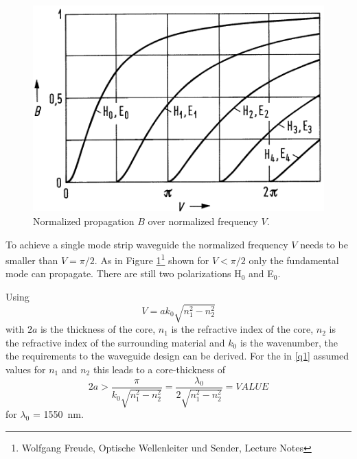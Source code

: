 \begin{figure}%
\centering
\includegraphics[width=.5\columnwidth]{Grafiken/SingleMode.png}%
\caption{Normalized propagation $B$ over normalized frequency $V$.}%
\label{fig:singlemoded}%
\end{figure}
To achieve a single mode strip waveguide the normalized frequency $V$ needs to be smaller than $V=\pi/2$. As in Figure \ref{fig:singlemoded}\footnote[1]{Wolfgang Freude, Optische Wellenleiter und Sender, Lecture Notes} shown for $V < \pi/2$ only the fundamental mode can propagate. There are still two polarizations H$_0$ and E$_0$.

Using \begin{equation}
V=ak_0\sqrt{n_1^2-n_2^2}
\label{eq:norm_freq}
\end{equation}
with $2a$ is the thickness of the core, $n_1$ is the refractive index of the core, $n_2$ is the refractive index of the surrounding material and $k_0$ is the wavenumber, the the requirements to the waveguide design can be derived.
For the in \ref{q1} assumed values for $n_1$ and $n_2$ this leads to a core-thickness of
\begin{equation}
2a>\frac{\pi}{k_0\sqrt{n_1^2-n_2^2}}=\frac{\lambda_0}{2\sqrt{n_1^2-n_2^2}}=VALUE
\label{eq:}
\end{equation}
for $\lambda_0$ = 1550~nm.
